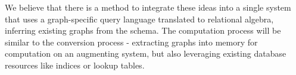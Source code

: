 \documentclass[11pt,letterpaper]{article}
\begin{document}
We believe that there is a method to integrate these ideas into a single system that uses a graph-specific query language translated to relational algebra, inferring existing graphs from the schema. The computation process will be similar to the conversion process - extracting graphs into memory for computation on an augmenting system, but also leveraging existing database resources like indices or lookup tables.


\clearpage



%
%
%
%
%
%
%
%
\end{document}
